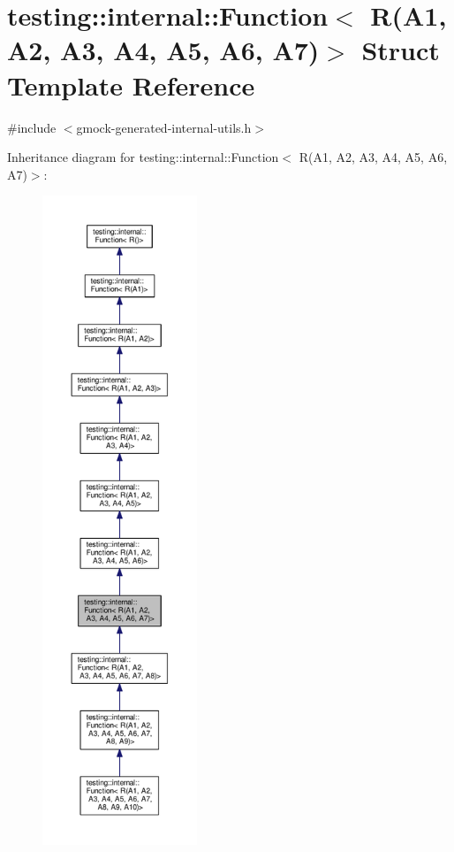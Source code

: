 \hypertarget{structtesting_1_1internal_1_1Function_3_01R_07A1_00_01A2_00_01A3_00_01A4_00_01A5_00_01A6_00_01A7_08_4}{}\section{testing\+:\+:internal\+:\+:Function$<$ R(A1, A2, A3, A4, A5, A6, A7)$>$ Struct Template Reference}
\label{structtesting_1_1internal_1_1Function_3_01R_07A1_00_01A2_00_01A3_00_01A4_00_01A5_00_01A6_00_01A7_08_4}


{\ttfamily \#include $<$gmock-\/generated-\/internal-\/utils.\+h$>$}



Inheritance diagram for testing\+:\+:internal\+:\+:Function$<$ R(A1, A2, A3, A4, A5, A6, A7)$>$\+:\nopagebreak
\begin{figure}[H]
\begin{center}
\leavevmode
\includegraphics[height=550pt]{structtesting_1_1internal_1_1Function_3_01R_07A1_00_01A2_00_01A3_00_01A4_00_01A5_00_01A6_00_01A7_08_4__inherit__graph}
\end{center}
\end{figure}


